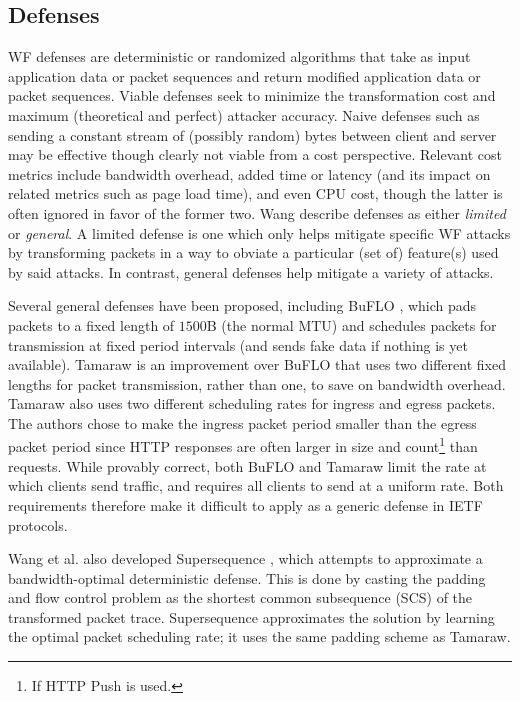 \documentclass[runningheads]{llncs}
\begin{document}
\subsection{Defenses} \label{sec:defenses}
WF defenses are deterministic or randomized algorithms that take as input application data or packet sequences
and return modified application data or packet sequences. Viable defenses seek to minimize the transformation
cost and maximum (theoretical and perfect) attacker accuracy. Naive defenses such as sending a constant stream
of (possibly random) bytes between client and server may be effective though clearly not viable from a cost
perspective. Relevant cost metrics include bandwidth overhead, added time or latency (and its impact on related
metrics such as page load time), and even CPU cost, though the latter is often ignored in favor of the former two.
Wang \cite{wang2016website} describe defenses as either \emph{limited} or \emph{general}. A limited defense is
one which only helps mitigate specific WF attacks by transforming packets in a way to obviate a particular
(set of) feature(s) used by said attacks. In contrast, general defenses help mitigate a variety of attacks.

Several general defenses have been proposed, including BuFLO \cite{dyer2012peek}, which pads packets to
a fixed length of $1500$B (the normal MTU) and schedules packets for transmission at fixed period intervals
(and sends fake data if nothing is yet available). Tamaraw \cite{wang2014comparing} is an improvement over BuFLO
that uses two different fixed lengths for packet transmission, rather than one, to save on bandwidth overhead.
Tamaraw also uses two different scheduling rates for ingress and egress packets. The authors chose to make
the ingress packet period smaller than the egress packet period since HTTP responses are often larger in size
and count\footnote{If HTTP Push is used.} than requests. While provably correct, both BuFLO and Tamaraw limit
the rate at which clients send traffic, and requires all clients to send at a uniform rate. Both requirements
therefore make it difficult to apply as a generic defense in IETF protocols.

Wang et al. also developed Supersequence \cite{wang2016website}, which attempts to approximate a bandwidth-optimal
deterministic defense. This is done by casting the padding and flow control problem as the shortest common
subsequence (SCS) of the transformed packet trace. Supersequence approximates the solution by learning the optimal
packet scheduling rate; it uses the same padding scheme as Tamaraw.
\end{document}
